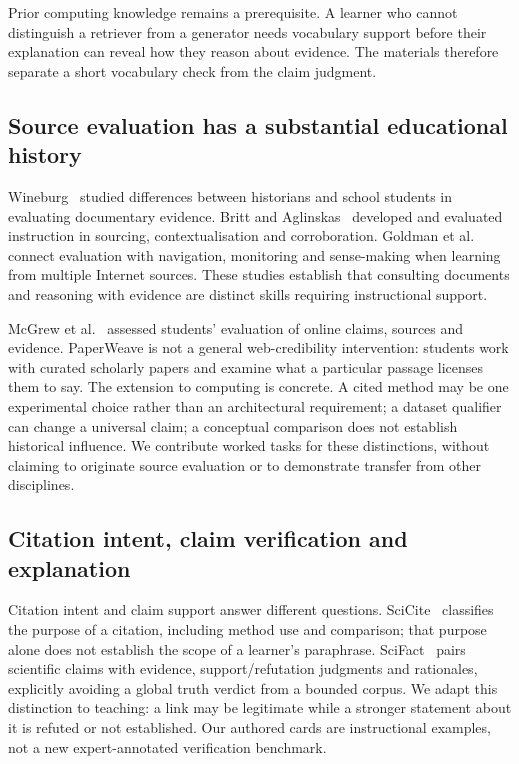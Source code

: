 Prior computing knowledge remains a prerequisite. A learner who cannot distinguish a retriever from a generator needs vocabulary support before their explanation can reveal how they reason about evidence. The materials therefore separate a short vocabulary check from the claim judgment.

\subsection{Source evaluation has a substantial educational history}
Wineburg~\cite{wineburg} studied differences between historians and school students in evaluating documentary evidence. Britt and Aglinskas~\cite{britt} developed and evaluated instruction in sourcing, contextualisation and corroboration. Goldman et al.~\cite{goldman} connect evaluation with navigation, monitoring and sense-making when learning from multiple Internet sources. These studies establish that consulting documents and reasoning with evidence are distinct skills requiring instructional support.

McGrew et al.~\cite{mcgrew} assessed students' evaluation of online claims, sources and evidence. PaperWeave is not a general web-credibility intervention: students work with curated scholarly papers and examine what a particular passage licenses them to say. The extension to computing is concrete. A cited method may be one experimental choice rather than an architectural requirement; a dataset qualifier can change a universal claim; a conceptual comparison does not establish historical influence. We contribute worked tasks for these distinctions, without claiming to originate source evaluation or to demonstrate transfer from other disciplines.

\subsection{Citation intent, claim verification and explanation}
Citation intent and claim support answer different questions. SciCite~\cite{scicite} classifies the purpose of a citation, including method use and comparison; that purpose alone does not establish the scope of a learner's paraphrase. SciFact~\cite{scifact} pairs scientific claims with evidence, support/refutation judgments and rationales, explicitly avoiding a global truth verdict from a bounded corpus. We adapt this distinction to teaching: a link may be legitimate while a stronger statement about it is refuted or not established. Our authored cards are instructional examples, not a new expert-annotated verification benchmark.

